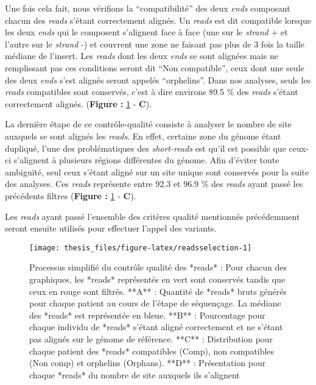 \documentclass[12pt,twoside]{reedthesis}
\theoremstyle{definition}
\theoremstyle{definition}
\theoremstyle{remark}
\begin{document}
  Une fois cela fait, nous vérifions la ``compatibilité'' des deux
  \emph{ends} composant chacun des \emph{reads} s'étant correctement
  alignés. Un \emph{reads} est dit compatible lorsque les deux \emph{ends}
  qui le composent s'alignent face à face (une sur le \emph{strand} + et
  l'autre sur le \emph{strand} -) et couvrent une zone ne faisant pas plus
  de 3 fois la taille médiane de l'insert. Les \emph{reads} dont les deux
  \emph{ends} se sont alignées mais ne remplissant pas ces conditions
  seront dit ``Non compatible'', ceux dont une seule des deux \emph{ends}
  s'est alignés seront appelés ``orphelins''. Dans nos analyses, seuls les
  \emph{reads} compatibles sont conservés, c'est à dire environs 89.5 \%
  des \emph{reads} s'étant correctement alignés. (\textbf{Figure :
  }\ref{fig:readsselection} - \textbf{C}).
  
  La dernière étape de ce contrôle-qualité consiste à analyser le nombre
  de site auxquels se sont alignés les \emph{reads}. En effet, certaine
  zone du génome étant dupliqué, l'une des problématiques des
  \emph{short-reads} est qu'il est possible que ceux-ci s'alignent à
  plusieurs régions différentes du génome. Afin d'éviter toute ambiguïté,
  seul ceux s'étant aligné sur un site unique sont conservés pour la suite
  des analyses. Ces \emph{reads} représente entre 92.3 et 96.9 \% des
  \emph{reads} ayant passé les précédents filtres (\textbf{Figure :
  }\ref{fig:readsselection} - \textbf{C}).
  
  Les \emph{reads} ayant passé l'ensemble des critères qualité mentionnés
  précédemment seront ensuite utilisés pour effectuer l'appel des
  variants.
  
  \newpage
  
  \begin{figure}
  
  {\centering \texttt{[image: thesis\_files/figure-latex/readsselection-1]} 
  
  }
  
  \caption[Processus simplifié du contrôle qualité des *reads*]{Processus simplifié du contrôle qualité des *reads* : Pour chacun des graphiques, les *reads* représentés en vert sont conservés tandis que ceux en rouge sont filtrés. **A** : Quantité de *reads* bruts générés pour chaque patient au cours de l'étape de séquençage. La médiane des *reads* est représentée en bleue. **B** : Pourcentage pour chaque individu de *reads* s'étant aligné correctement et ne s'étant pas alignés sur le génome de référence. **C** : Distribution pour chaque patient des *reads* compatibles (Comp), non compatibles (Non comp) et orphelins (Orphans). **D** : Présentation pour chaque *reads* du nombre de site auxquels ils s'alignent}\label{fig:readsselection}
  \end{figure}
  
\end{document}
